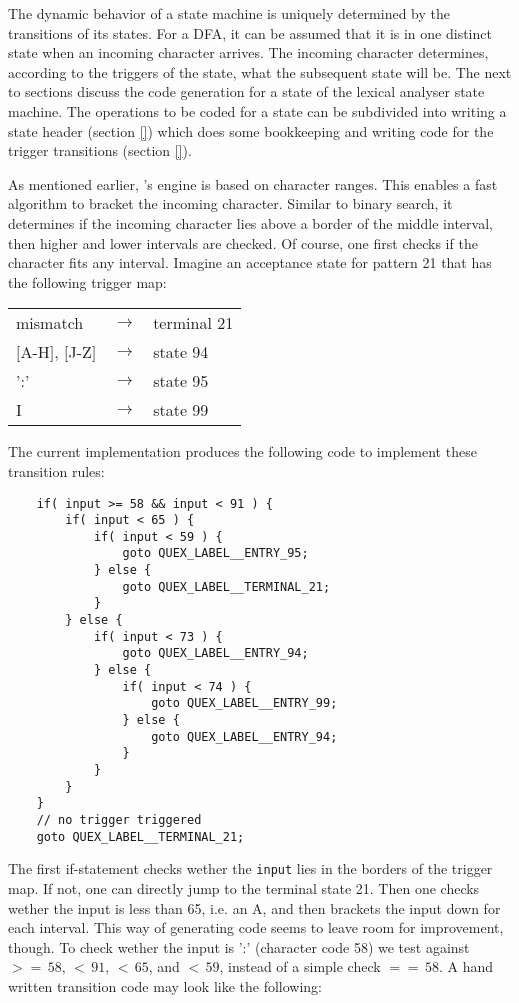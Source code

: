 The dynamic behavior of a state machine is uniquely determined by the
transitions of its states. For a DFA, it can be assumed that it is in one
distinct state when an incoming character arrives. The incoming character
determines, according to the triggers of the state, what the subsequent state
will be.  The next to sections discuss the code generation for a 
state of the lexical analyser state machine.
The operations to be coded for a state can be subdivided into writing
a state header (section \ref{}) which does some bookkeeping and writing
code for the trigger transitions (section \ref{}).


As mentioned earlier, \quex's engine is based on character ranges. This enables
a fast algorithm to bracket the incoming character. Similar to binary search\cite{},
  it determines if the incoming character lies above a border of the
  middle interval, then higher and lower intervals are checked. Of course, 
  one first checks if the character fits any interval. Imagine an acceptance state
  for pattern 21 that has the following trigger map:

\begin{tabular}{lll}
    mismatch             & $\longrightarrow$  & terminal 21 \\
    $[$A-H$]$, $[$J-Z$]$ & $\longrightarrow$  & state 94 \\
    ':'                  & $\longrightarrow$  & state 95 \\
    I                    & $\longrightarrow$  & state 99 
\end{tabular}

The current implementation produces the following code to implement 
these transition rules:

\begin{lstlisting}
    if( input >= 58 && input < 91 ) {
        if( input < 65 ) {
            if( input < 59 ) {
                goto QUEX_LABEL__ENTRY_95;
            } else {
                goto QUEX_LABEL__TERMINAL_21;
            }
        } else {
            if( input < 73 ) {
                goto QUEX_LABEL__ENTRY_94;  
            } else {
                if( input < 74 ) {
                    goto QUEX_LABEL__ENTRY_99;
                } else {
                    goto QUEX_LABEL__ENTRY_94;
                }
            }
        }
    }
    // no trigger triggered 
    goto QUEX_LABEL__TERMINAL_21;
\end{lstlisting}

The first if-statement checks wether the {\tt input} lies in the borders of the
trigger map. If not, one can directly jump to the terminal state 21. Then one
checks wether the input is less than 65, i.e. an A, and then brackets the input
down for each interval. This way of generating code seems to leave room for
improvement, though.  To check wether the input is ':' (character code 58) we
test against $>=\,58$, $<\,91$, $<\,65$, and $<\,59$, instead of a simple check
$==\,58$. A hand written transition code may look like the following:

